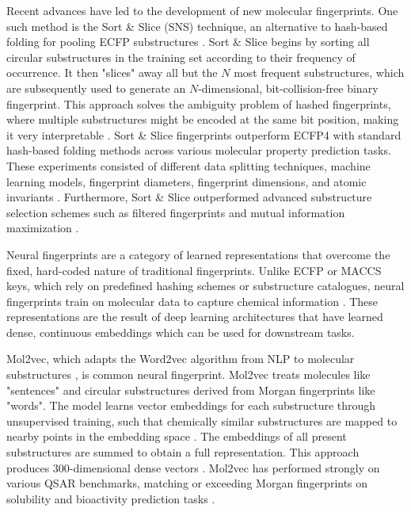 Recent advances have led to the development of new molecular fingerprints. One such method is the Sort \& Slice (SNS) technique, an alternative to hash-based folding for pooling ECFP substructures \citep{sns}. Sort \& Slice begins by sorting all circular substructures in the training set according to their frequency of occurrence. It then "slices" away all but the $N$ most frequent substructures, which are subsequently used to generate an $N$-dimensional, bit-collision-free binary fingerprint. This approach solves the ambiguity problem of hashed fingerprints, where multiple substructures might be encoded at the same bit position, making it very interpretable \citep{sns}. Sort \& Slice fingerprints outperform ECFP4 with standard hash-based folding methods across various molecular property prediction tasks. These experiments consisted of different data splitting techniques, machine learning models, fingerprint diameters, fingerprint dimensions, and atomic invariants \citep{sns}. Furthermore, Sort \& Slice outperformed advanced substructure selection schemes such as filtered fingerprints and mutual information maximization \citep{sns}. 


Neural fingerprints are a category of learned  representations that overcome the fixed, hard-coded nature of traditional fingerprints. Unlike ECFP or MACCS keys, which rely on predefined hashing schemes or substructure catalogues, neural fingerprints train on molecular data to capture chemical information \citep{Jaeger2018, Chithrananda2020}. These representations are the result of deep learning architectures that have learned dense, continuous embeddings which can be used for downstream tasks. 

Mol2vec, which adapts the Word2vec algorithm from NLP to molecular substructures \citep{Jaeger2018}, is common neural fingerprint. Mol2vec treats molecules like "sentences" and circular substructures derived from Morgan fingerprints like "words". The model learns vector embeddings for each substructure through unsupervised training, such that chemically similar substructures are mapped to nearby points in the embedding space \citep{Jaeger2018}. The embeddings of all present substructures are summed to obtain a full representation. This approach produces 300-dimensional dense vectors \citep{Jaeger2018}. Mol2vec has performed strongly on various QSAR benchmarks, matching or exceeding Morgan fingerprints on solubility and bioactivity prediction tasks \citep{Jaeger2018}.

